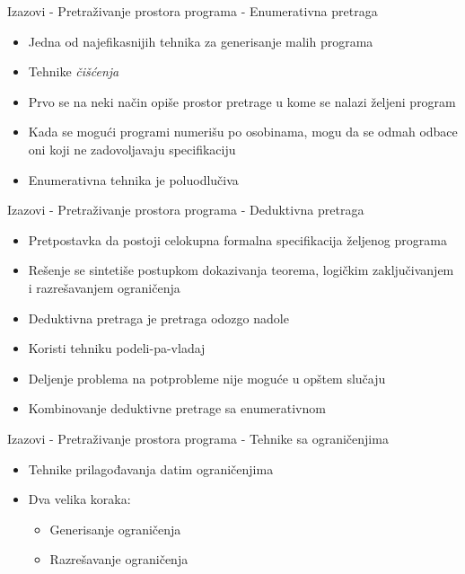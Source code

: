 \documentclass{beamer}
\begin{document}
\begin{frame}{Izazovi - Pretraživanje prostora programa - Enumerativna pretraga}
    \begin{itemize}
        \item Jedna od najefikasnijih tehnika za generisanje malih programa
        \item Tehnike \emph{čišćenja}
        \item Prvo se na neki način opiše prostor pretrage u kome se nalazi željeni program
        \item Kada se mogući programi numerišu po osobinama, mogu da se odmah odbace oni koji ne zadovoljavaju specifikaciju
        \item Enumerativna tehnika je poluodlučiva
    \end{itemize}
\end{frame}

\begin{frame}{Izazovi - Pretraživanje prostora programa - Deduktivna pretraga}
    \begin{itemize}
        \item Pretpostavka da postoji celokupna formalna specifikacija željenog programa
        \item Rešenje se sintetiše postupkom dokazivanja teorema, logičkim zaključivanjem i razrešavanjem ograničenja
        \item Deduktivna pretraga je pretraga odozgo nadole
        \item Koristi tehniku podeli-pa-vladaj
        \item Deljenje problema na potprobleme nije moguće u opštem slučaju
        \item Kombinovanje deduktivne pretrage sa enumerativnom
    \end{itemize}
\end{frame}

\begin{frame}{Izazovi - Pretraživanje prostora programa - Tehnike sa ograničenjima}
    \begin{itemize}
        \item Tehnike prilagođavanja datim ograničenjima
        \item Dva velika koraka:
            \begin{itemize}
                \item Generisanje ograničenja
                \item Razrešavanje ograničenja
            \end{itemize}
    \end{itemize}
\end{frame}
\end{document}
